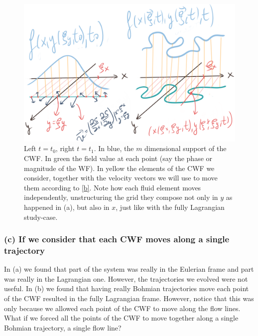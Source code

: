 \documentclass[11pt, a4paper]{article} %
\begin{document}
\begin{figure}[h!]
  \centering
    \includegraphics[width=0.65\linewidth]{unstructuring.png}
  \caption{Left $t=t_0$, right $t=t_1$. In blue, the $m$ dimensional support of the CWF. In green the field value at each point (say the phase or magnitude of the WF). In yellow the elements of the CWF we consider, together with the velocity vectors we will use to move them according to \eqref{b}. Note how each fluid element moves independently, unstructuring the grid they compose not only in $y$ as happened in (a), but also in $x$, just like with the fully Lagrangian study-case. }
  \label{fig:fallback}
\end{figure}

\subsubsection*{(c) If we consider that each CWF moves along a single trajectory}
In (a) we found that part of the system was really in the Eulerian frame and part was really in the Lagrangian one. However, the trajectories we evolved were not useful. In (b) we found that having really Bohmian trajectories move each point of the CWF resulted in the fully Lagrangian frame. However, notice that this was only because we allowed each point of the CWF to move along the flow lines. What if we forced all the points of the CWF to move together along a single Bohmian trajectory, a single flow line?
\end{document}
